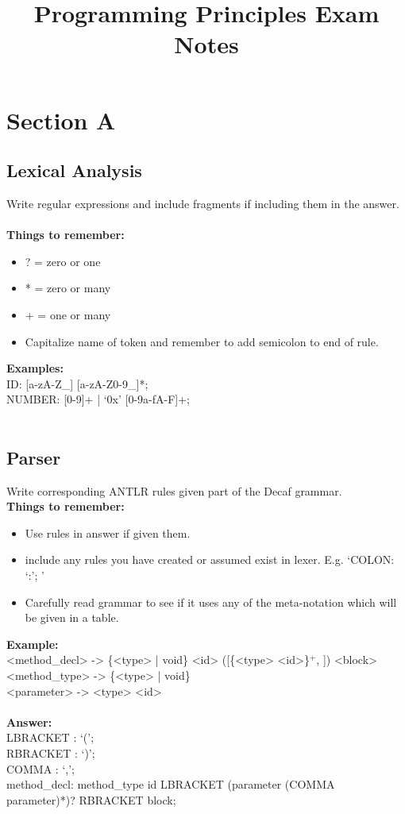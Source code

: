 

\title{\vspace{-3.0cm}\textbf{Programming Principles Exam Notes}}
\date{}

	\maketitle
	\section*{Section A}
	\subsection*{Lexical Analysis}
	Write regular expressions and include fragments if including them in the answer.\\\\
	\textbf{Things to remember:}
	\begin{itemize}
		\item ? = zero or one
		\item * = zero or many
		\item + = one or many
		\item Capitalize name of token and remember to add semicolon to end of rule.
	\end{itemize}
	\textbf{Examples:}\\
	ID: [a-zA-Z\_] [a-zA-Z0-9\_]*;\\
	NUMBER: [0-9]+ | `0x' [0-9a-fA-F]+;\\\\
	\subsection*{Parser}
	Write corresponding ANTLR rules given part of the Decaf grammar.\\
	\textbf{Things to remember:}
	\begin{itemize}
		\item Use rules in answer if given them.
		\item include any rules you have created or assumed exist in lexer. E.g. `COLON: `:'; '
		\item Carefully read grammar to see if it uses any of the meta-notation which will be given in a table.
	\end{itemize}
	\textbf{Example:}\\
	<method\_decl>  -> \{<type> | void\} <id> ([\{<type> <id>\}$^{+}$, ]) <block>\\
	<method\_type>  -> \{<type> | void\}\\
	<parameter>  -> <type> <id>\\\\
	\noindent
	\textbf{Answer:}\\ 
	LBRACKET : `(';\\
	RBRACKET : `)';\\
	COMMA : `,'; \\
	method\_decl: method\_type  id LBRACKET (parameter (COMMA parameter)*)? RBRACKET block;\\

